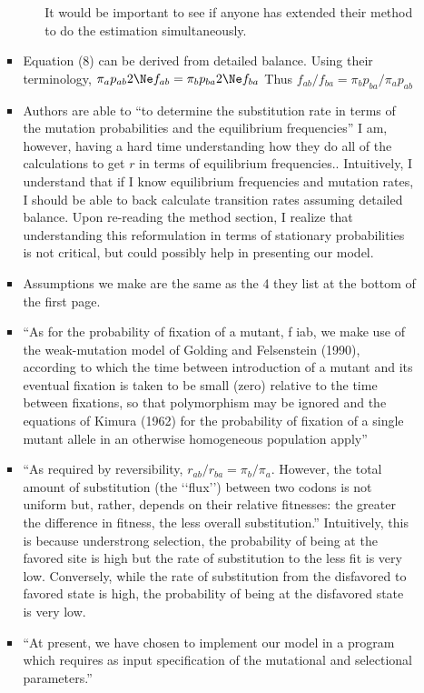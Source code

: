\begin{itemize}
\begin{itemize}
\begin{itemize}
\begin{itemize}
    It would be important to see if anyone has extended their method to do the estimation simultaneously.
  \end{itemize}
\item Equation (8) can be derived from detailed balance.
  Using their terminology, $\pi_a p_{ab} 2 \Ne  f_{ab}  = \pi_b p_{ba} 2 \Ne f_{ba}$
  Thus $f_{ab}/ f_{ba}  = \pi_b p_{ba}/\pi_a p_{ab} $
\item Authors are able to ``to determine the substitution rate in terms of the mutation probabilities and the equilibrium frequencies''
  I am, however, having a hard time understanding how they do all of the calculations to get $r$ in terms of equilibrium frequencies..
  Intuitively, I understand that if I know equilibrium frequencies and mutation rates, I should be able to back calculate transition rates assuming detailed balance.
  Upon re-reading the method section, I realize that understanding this reformulation in terms of stationary probabilities is not critical, but could possibly help in presenting our model.
  \item Assumptions we make are the same as the 4 they list at the bottom of the first page.
  \item ``As for the probability of fixation of a mutant, f iab, we make use of the weak-mutation model of Golding and Felsenstein (1990), according to which the time between introduction of a mutant and its eventual fixation is taken to be small (zero) relative to the time between fixations, so that polymorphism may be ignored and the equations of Kimura (1962) for the probability of fixation of a single mutant allele in an otherwise homogeneous population apply''
  \item ``As required by reversibility, $r_{ab} /r_{ba} = \pi_b/\pi_a$. However, the total amount of substitution (the ‘‘flux’’) between two codons is not uniform but, rather, depends on their relative fitnesses: the greater the difference in fitness, the less overall substitution.''
    Intuitively, this is because understrong selection, the probability of being at the favored site is high but the rate of substitution to the less fit is very low.
    Conversely, while the rate of substitution from the disfavored to favored state is high, the probability of being at the disfavored state is very low.
  \item ``At present, we have chosen to implement our model in a program which requires as input specification of the mutational and selectional parameters.'' 
    \begin{itemize}

\end{itemize}
\end{itemize}
\end{itemize}
\end{itemize}
